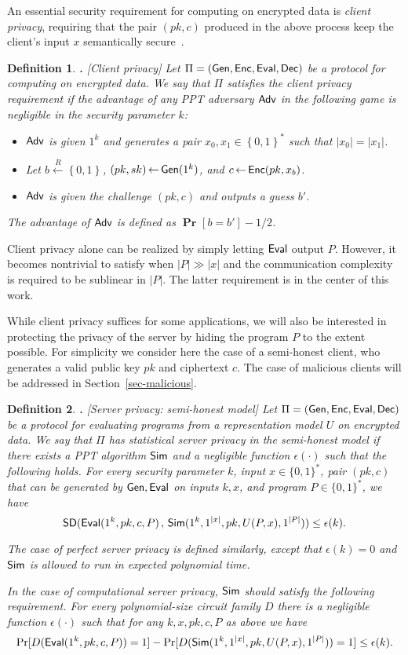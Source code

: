\documentclass{article}
\newcommand{\SD}{{\sf SD }}
\renewcommand{\sim}{{\sf Sim}}
\newcommand{\adv}{{\sf Adv }}
\newcommand{\fnrngdom}[2]{#1\to#2}
\newcommand{\fndef}[3]{{#1\,:\,\fnrngdom{#2}{#3}}}
\newcommand{\set}[1]{\left\{#1\right\}}
\newcommand{\size}[1]{|#1|}
\newtheorem{DEFINITION}{Definition}[section]
\newenvironment{definition}{\begin{DEFINITION} \hspace{-.85em} {\bf .} \rm}%
	{\end{DEFINITION}}
\newcommand{\from}{{\,\leftarrow\,}}
\newcommand{\prob}[2][]{{\mathop{\mathbf{Pr}}_{#1}\!{\left[{#2}\right]}}}
\newcommand{\samp}[2]{#1\from #2}
\newcommand{\usamp}[2]{#1\stackrel{R}{\leftarrow}#2}
\newcommand{\bools}[1][]{{\set{0,1}}^{#1}}
\newcommand{\gen}{{\sf Gen}}
\newcommand{\enc}{{\sf Enc}}
\newcommand{\eval}{{\sf Eval}}
\newcommand{\dec}{{\sf Dec}}
\newcommand{\eps}{{\epsilon}}
\begin{document}
An essential security requirement for computing on encrypted data is
{\em client privacy}, requiring that the pair $(pk,c)$ produced in
the above process keep the client's input $x$ semantically
secure~\cite{GM,Goldbook}.
\begin{definition}[Client privacy]
\label{def-clientprivacy} Let $\Pi=(\gen,\enc,\eval,\dec)$ be a
protocol for computing on encrypted data. We say that $\Pi$
satisfies the {\em client privacy} requirement if the advantage of
any PPT adversary $\adv$ in the following game is negligible in the
security parameter $k$:
\begin{itemize}
\item $\adv$ is given $1^k$ and generates a pair
$x_0,x_1\in\bools[*]$ such that $\size{x_0}=\size{x_1}$.
\item Let $\usamp{b}{\bools}$, $\samp{(pk,sk)}{\gen(1^k)}$,
and $\samp{c}{\enc(pk,x_b)}$.
\item $\adv$ is given the challenge $(pk,c)$ and outputs a guess $b'$.
\end{itemize}
The advantage of $\adv$ is defined as $\prob{b=b'}-1/2$.
\end{definition}
Client privacy alone can be realized by simply letting $\eval$
output $P$. However, it becomes nontrivial to satisfy when
$\size{P}\gg \size{x}$ and the communication complexity is required
to be sublinear in $\size{P}$. The latter requirement is in the
center of this work.

While client privacy suffices for some applications, we will also be
interested in protecting the privacy of the server by hiding the
program $P$ to the extent possible.  For simplicity we consider here
the case of a semi-honest client, who generates a valid public key
$pk$ and ciphertext $c$. The case of malicious clients will be
addressed in Section~\ref{sec-malicious}.

\begin{definition}[Server privacy: semi-honest model]
\label{def-serverprivacy} Let $\Pi=(\gen,\enc,\eval,\dec)$ be a
protocol for evaluating programs from a representation model
$U$ on encrypted data. We say that $\Pi$ has {\em statistical
server privacy in the semi-honest model} if there exists a PPT
algorithm $\sim$ and a negligible function $\eps(\cdot)$ such that
the following holds. For every security parameter $k$, input
$x\in\{0,1\}^*$, pair $(pk,c)$ that can be generated by
$\gen,\eval$ on inputs $k,x$, and program $P\in\{0,1\}^*$, we have
\[ \SD(\eval(1^k,pk,c,P)\,,\,\sim(1^k, 1^{|x|},
pk, U(P,x), 1^{\size{P}})) \le \epsilon(k).\]

The case of {\em  perfect server privacy} is defined
similarly, except that
$\eps(k)=0$ and $\sim$ is allowed to run in expected polynomial
time.

In the case of {\em computational server privacy}, $\sim$ should
satisfy the following requirement. For every polynomial-size circuit
family $D$ there is a negligible function $\eps(\cdot)$ such that
for any $k,x,pk,c,P$ as above we have
\[ \Pr[D(\eval(1^k,pk,c,P))=1]-\Pr[D(\sim(1^k, 1^{|x|},
pk, U(P,x), 1^{\size{P}}))=1]
\le \eps(k).\]
\end{definition}
\end{document}
